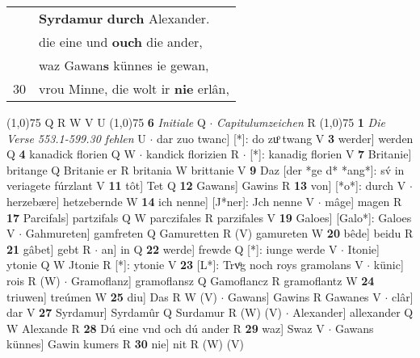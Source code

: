 \documentclass[8pt,a4paper,notitlepage]{article}
\begin{document}
\begin{table}[ht]
\begin{minipage}[t]{0.5\linewidth}
\begin{tabular}{rl}
 & \textbf{Syrdamur} \textbf{durch} Alexander.\\ 
 & die eine und \textbf{ouch} die ander,\\ 
 & waz Gawan\textbf{s} künnes ie gewan,\\ 
30 & vrou Minne, die wolt ir \textbf{nie} erlân,\\ 
\end{tabular}
\scriptsize
\line(1,0){75} \newline
Q R W V U \newline
\line(1,0){75} \newline
\textbf{6} \textit{Initiale} Q   $\cdot$ \textit{Capitulumzeichen} R  \newline
\line(1,0){75} \newline
\textbf{1} \textit{Die Verse 553.1-599.30 fehlen} U   $\cdot$ dar zuo twanc] [*]: do zuͦ twang V \textbf{3} werder] werden Q \textbf{4} kanadick florien Q W  $\cdot$ kandick florizien R  $\cdot$ [*]: kanadig florien V \textbf{7} Britanie] britange Q Britanie er R britania W brittanie V \textbf{9} Daz [der *ge d* *ang*]: sv́ in veriagete fúrzlant V \textbf{11} tôt] Tet Q \textbf{12} Gawans] Gawins R \textbf{13} von] [*o*]: durch V  $\cdot$ herzebære] hetzebernde W \textbf{14} ich nenne] [J*ner]: Jch nenne V  $\cdot$ mâge] magen R \textbf{17} Parcifals] partzifals Q W parczifales R parzifales V \textbf{19} Galoes] [Galo*]: Galoes V  $\cdot$ Gahmureten] gamfreten Q Gamuretten R (V) gamureten W \textbf{20} bêde] beidu R \textbf{21} gâbet] gebt R  $\cdot$ an] in Q \textbf{22} werde] frewde Q [*]: iunge werde V  $\cdot$ Itonie] ytonie Q W Jtonie R [*]: ytonie V \textbf{23} [L*]:  Trvͦg noch roys gramolans V  $\cdot$ künic] rois R (W)  $\cdot$ Gramoflanz] gramoflansz Q Gamoflancz R gramoflantz W \textbf{24} triuwen] treúmen W \textbf{25} diu] Das R W (V)  $\cdot$ Gawans] Gawins R Gawanes V  $\cdot$ clâr] dar V \textbf{27} Syrdamur] Syrdamûr Q Surdamur R (W) (V)  $\cdot$ Alexander] allexander Q W Alexande R \textbf{28} Dú eine vnd och dú ander R \textbf{29} waz] Swaz V  $\cdot$ Gawans künnes] Gawin kumers R \textbf{30} nie] nit R (W) (V) \newline
\end{minipage}
\end{table}
\end{document}

